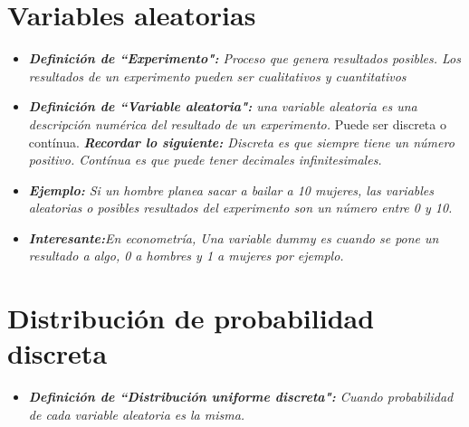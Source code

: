\section{Variables aleatorias}
\begin{itemize}
    \item \emph{\textbf{Definición de ``Experimento":} Proceso que genera resultados posibles. Los resultados de un experimento pueden ser cualitativos y cuantitativos }
    \item \emph{\textbf{Definición de ``Variable aleatoria":} una variable aleatoria es una descripción numérica del resultado de un experimento.} Puede ser discreta o contínua. \emph{\textbf{Recordar lo siguiente: }Discreta es que siempre tiene un número positivo. Contínua es que puede tener decimales infinitesimales.}
    \item \emph{\textbf{Ejemplo: }Si un hombre planea sacar a bailar a 10 mujeres, las variables aleatorias o posibles resultados del experimento son un número entre 0 y 10.}
    \item \emph{\textbf{Interesante:}En econometría, Una variable dummy es cuando se pone un resultado a algo, 0 a hombres y 1 a mujeres por ejemplo.}
\end{itemize}


\section{Distribución de probabilidad discreta}
\begin{itemize}
    \item \emph{\textbf{Definición de ``Distribución uniforme discreta":} Cuando probabilidad de cada variable aleatoria es la misma.}
\end{itemize}



